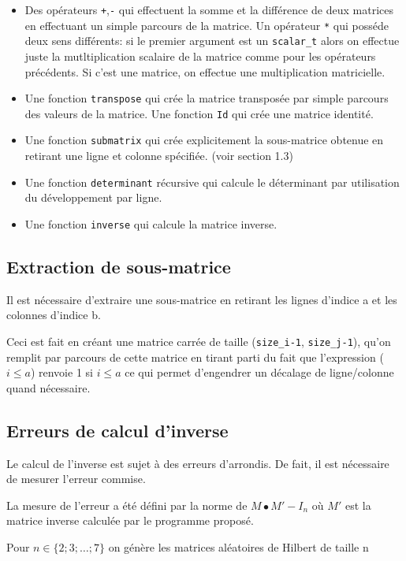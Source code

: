 \documentclass[a4paper,11pt]{article}
\begin{document}
\begin{itemize}
\item Des opérateurs \texttt{+},\texttt{-} qui effectuent la somme et la différence de deux matrices en effectuant un simple parcours de la matrice. Un opérateur \texttt{*} qui posséde deux sens différents: si le premier argument est un \texttt{scalar\_t} alors on effectue juste la mutltiplication scalaire de la matrice comme pour les opérateurs précédents. Si c'est une matrice, on effectue une multiplication matricielle.
\item Une fonction \texttt{transpose} qui crée la matrice transposée par simple parcours des valeurs de la matrice. Une fonction \texttt{Id} qui crée une matrice identité.
\item Une fonction \texttt{submatrix} qui crée explicitement la sous-matrice obtenue en retirant une ligne et colonne spécifiée. (voir section 1.3)
\item Une fonction \texttt{determinant} récursive qui calcule le déterminant par utilisation du développement par ligne.
\item Une fonction \texttt{inverse} qui calcule la matrice inverse.
\end{itemize}

\subsection{Extraction de sous-matrice}

Il est nécessaire d'extraire une sous-matrice en retirant les lignes d'indice a et les colonnes d'indice b. 

Ceci est fait en créant une matrice carrée de taille (\texttt{size\_i-1}, \texttt{size\_j-1}), qu'on remplit par parcours de cette matrice en tirant parti du fait que l'expression
($i \leq a$) renvoie 1 si $i \leq a$ ce qui permet d'engendrer un décalage de ligne/colonne quand nécessaire.

\subsection{Erreurs de calcul d'inverse}

Le calcul de l'inverse est sujet à des erreurs d'arrondis. De fait, il est nécessaire de mesurer l'erreur commise.

La mesure de l'erreur a été défini par la norme de $M\bullet M' - I_n$ où $M'$ est la matrice inverse calculée par le programme proposé.

Pour $n \in \{2;3;\dots;7\}$ on génère les matrices aléatoires de Hilbert de taille n
\end{document}
